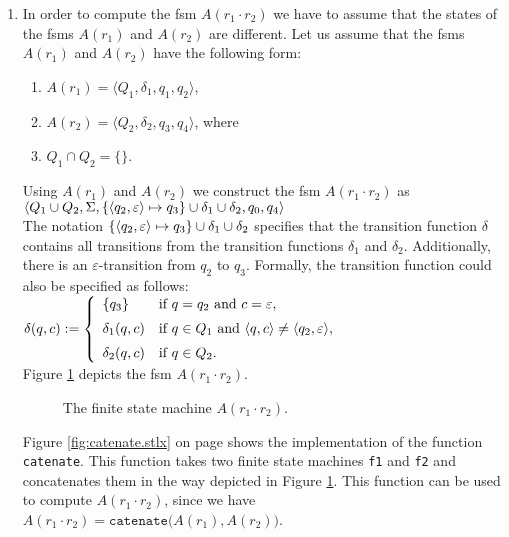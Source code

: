 \begin{enumerate}
\item In order to compute the fsm $A(r_1 \cdot r_2)$ 
      we have to assume that the states of the fsms
      $A(r_1)$ and $A(r_2)$ are different.  
      Let us assume that the fsms  $A(r_1)$ and $A(r_2)$ have the following form:
      \begin{enumerate}
      \item $A(r_1) = \langle Q_1, \delta_1, q_1, q_2 \rangle$,
      \item $A(r_2) = \langle Q_2, \delta_2, q_3, q_4 \rangle$, \quad where
      \item $Q_1 \cap Q_2 = \{\}$.
      \end{enumerate}
      Using $A(r_1)$ and $A(r_2)$ we construct the fsm $A(r_1 \cdot r_2)$ as
      \\[0.2cm]
      \hspace*{0.8cm}
       $\langle Q_1 \cup Q_2, \Sigma, 
                \{ \pair(q_2,\varepsilon) \mapsto q_3 \} 
                   \cup \delta_1 \cup \delta_2, q_0, q_4 \rangle$
      \\[0.2cm]
      The notation $\{ \pair(q_2,\varepsilon) \mapsto q_3 \} \cup \delta_1 \cup \delta_2$
      specifies that the transition function $\delta$ contains all transitions
      from the transition functions  $\delta_1$ and $\delta_2$.  Additionally,
      there is an  $\varepsilon$-transition from $q_2$ to
      $q_3$.  Formally, the transition function could also be specified as follows:
      \\[0.2cm]
      \hspace*{1.3cm}
      $\delta(q,c) := \left\{
      \begin{array}{ll}
        \{ q_3 \}       & \mbox{if $q = q_2$ and $c = \varepsilon$}, \\[0.2cm]
        \delta_1(q, c)  & \mbox{if $q \in Q_1$ and $\pair(q,c) \not= \pair(q_2,\varepsilon)$}, \\[0.2cm]
        \delta_2(q, c)  & \mbox{if $q \in Q_2$.} 
      \end{array}\right.
      $
      \\[0.2cm]
      Figure \ref{fig:aConcat.eps} depicts the fsm $A(r_1 \cdot r_2)$.
      
      \begin{figure}[!ht]
        \centering
      \caption{The finite state machine $A(r_1 \cdot r_2)$.}
      \label{fig:aConcat.eps}
      \end{figure}

      Figure \ref{fig:catenate.stlx} on page \pageref{fig:catenate.stlx} shows the
      implementation of the function \texttt{catenate}.  This function takes two
      finite state machines \texttt{f1} and \texttt{f2} and concatenates them in the way
      depicted in Figure \ref{fig:aConcat.eps}.  This function can be used
      to compute $A(r_1 \cdot r_2)$, since we have
      \\[0.2cm]
      \hspace*{1.3cm}
      $A(r_1 \cdot r_2) = \mathtt{catenate}\bigl(A(r_1), A(r_2)\bigr)$.


\end{enumerate}
